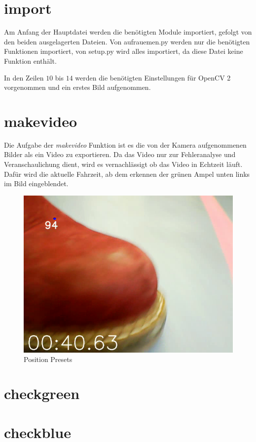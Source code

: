 \documentclass[a4paper, 12pt]{scrartcl}
\begin{document}
\section{import}


Am Anfang der Hauptdatei werden die benötigten Module importiert, gefolgt von den beiden ausgelagerten Dateien. Von aufrauemen.py werden nur die benötigten Funktionen importiert, von setup.py wird alles importiert, da diese Datei keine Funktion enthält.

In den Zeilen $10$ bis $14$ werden die benötigten Einstellungen für OpenCV 2 vorgenommen und ein erstes Bild aufgenommen.

\section{makevideo}


Die Aufgabe der \textit{makevideo} Funktion ist es die von der Kamera aufgenommenen Bilder als ein Video zu exportieren. Da das Video nur zur Fehleranalyse und Veranschaulichung dient, wird es vernachlässigt ob das Video in Echtzeit läuft. Dafür wird die aktuelle Fahrzeit, ab dem erkennen der grünen Ampel unten links im Bild eingeblendet.

\begin{figure}[ht!] \centering
	\includegraphics[width=.5\textwidth]{schuh_im_bild.png}
	\caption{Position Presets}
	\label{schuh_im_bild}
\end{figure}

\section{checkgreen}


\section{checkblue}

\end{document}
